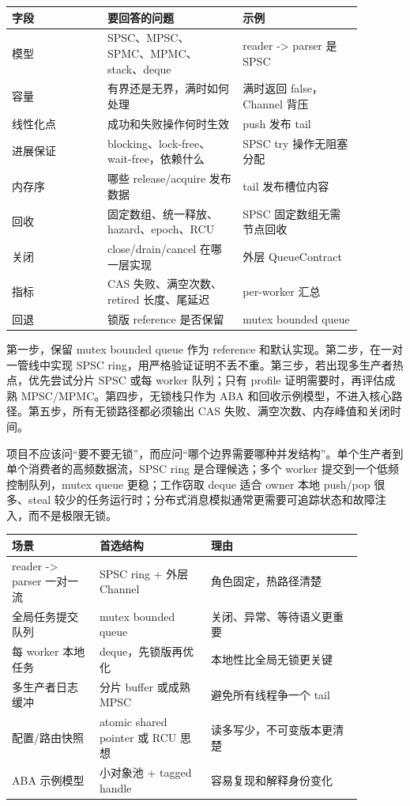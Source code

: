 \begin{center}
\begin{tabular}{p{0.24\linewidth}p{0.34\linewidth}p{0.30\linewidth}}
\toprule
字段 & 要回答的问题 & 示例 \\
\midrule
模型 & SPSC、MPSC、SPMC、MPMC、stack、deque & reader -> parser 是 SPSC \\
容量 & 有界还是无界，满时如何处理 & 满时返回 false，Channel 背压 \\
线性化点 & 成功和失败操作何时生效 & push 发布 tail \\
进展保证 & blocking、lock-free、wait-free，依赖什么 & SPSC try 操作无阻塞分配 \\
内存序 & 哪些 release/acquire 发布数据 & tail 发布槽位内容 \\
回收 & 固定数组、统一释放、hazard、epoch、RCU & SPSC 固定数组无需节点回收 \\
关闭 & close/drain/cancel 在哪一层实现 & 外层 QueueContract \\
指标 & CAS 失败、满空次数、retired 长度、尾延迟 & per-worker 汇总 \\
回退 & 锁版 reference 是否保留 & mutex bounded queue \\
\bottomrule
\end{tabular}
\end{center}

第一步，保留 mutex bounded queue 作为 reference 和默认实现。第二步，在一对一管线中实现 SPSC ring，用严格验证证明不丢不重。第三步，若出现多生产者热点，优先尝试分片 SPSC 或每 worker 队列；只有 profile 证明需要时，再评估成熟 MPSC/MPMC。第四步，无锁栈只作为 ABA 和回收示例模型，不进入核心路径。第五步，所有无锁路径都必须输出 CAS 失败、满空次数、内存峰值和关闭时间。

项目不应该问“要不要无锁”，而应问“哪个边界需要哪种并发结构”。单个生产者到单个消费者的高频数据流，SPSC ring 是合理候选；多个 worker 提交到一个低频控制队列，mutex queue 更稳；工作窃取 deque 适合 owner 本地 push/pop 很多、steal 较少的任务运行时；分布式消息模拟通常更需要可追踪状态和故障注入，而不是极限无锁。

\begin{center}
\begin{tabular}{p{0.22\linewidth}p{0.28\linewidth}p{0.38\linewidth}}
\toprule
场景 & 首选结构 & 理由 \\
\midrule
reader -> parser 一对一流 & SPSC ring + 外层 Channel & 角色固定，热路径清楚 \\
全局任务提交队列 & mutex bounded queue & 关闭、异常、等待语义更重要 \\
每 worker 本地任务 & deque，先锁版再优化 & 本地性比全局无锁更关键 \\
多生产者日志缓冲 & 分片 buffer 或成熟 MPSC & 避免所有线程争一个 tail \\
配置/路由快照 & atomic shared pointer 或 RCU 思想 & 读多写少，不可变版本更清楚 \\
ABA 示例模型 & 小对象池 + tagged handle & 容易复现和解释身份变化 \\
\bottomrule
\end{tabular}
\end{center}

